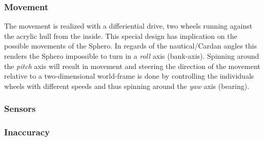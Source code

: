 \subsubsection{Movement}

The movement is realized with a differiential drive, two wheels running against the acrylic hull from the inside. This special design has implication on the possible movements of the Sphero. In regards of the nautical/Cardan angles  this renders the Sphero impossible to turn in a \emph{roll} axis (bank-axis). Spinning around the \emph{pitch} axis will result in movement and steering the direction of the movement relative to a two-dimensional world-frame is done by controlling the individuals wheels with different speeds and thus spinning around the \emph{yaw} axis (bearing).

\subsubsection{Sensors}

\subsubsection{Inaccuracy}
